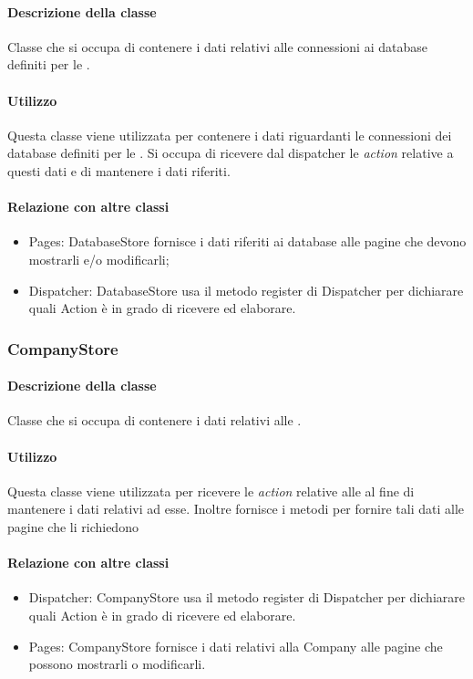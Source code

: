 \paragraph*{Descrizione della classe}
Classe che si occupa di contenere i dati relativi alle connessioni ai database definiti per le .
\paragraph*{Utilizzo}
Questa classe viene utilizzata per contenere i dati riguardanti le connessioni dei database definiti per le . Si occupa di ricevere dal dispatcher le \textit{action} relative a questi dati e di mantenere i dati riferiti.
\paragraph*{Relazione con altre classi}
\begin{itemize}
\item Pages: DatabaseStore fornisce i dati riferiti ai database alle pagine che devono mostrarli e/o modificarli;
\item Dispatcher: DatabaseStore usa il metodo register di Dispatcher per dichiarare quali Action è in grado di ricevere ed elaborare.
\end{itemize}

\subsubsection{CompanyStore}
\paragraph*{Descrizione della classe}
Classe che si occupa di contenere i dati relativi alle .
\paragraph*{Utilizzo}
Questa classe viene utilizzata per ricevere le \textit{action} relative alle  al fine di mantenere i dati relativi ad esse. Inoltre fornisce i metodi per fornire tali dati alle pagine che li richiedono
\paragraph*{Relazione con altre classi}
\begin{itemize}
\item Dispatcher: CompanyStore usa il metodo register di Dispatcher per dichiarare quali Action è in grado di ricevere ed elaborare.
\item Pages: CompanyStore fornisce i dati relativi alla Company alle pagine che possono mostrarli o modificarli.
\end{itemize}

